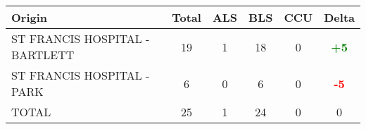 \documentclass{article}
\begin{document}
\begin{longtable}{l|cccc|c}
    \toprule
    Origin & Total & ALS & BLS & CCU & Delta \\
    \midrule
    
        
            ST FRANCIS HOSPITAL - BARTLETT & 19 & 1 & 18 & 0 & \textcolor{green}{\textbf{+5}} \\
        
    
        
            ST FRANCIS HOSPITAL - PARK & 6 & 0 & 6 & 0 & \textcolor{red}{\textbf{-5}} \\
        
    
        
            \hline
        
    
        
            TOTAL & 25 & 1 & 24 & 0 & 0 \\
        
    
    \bottomrule
\end{longtable}



\clearpage
\end{document}
